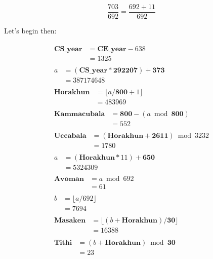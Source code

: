 \documentclass[11pt,oneside]{memoir-article}
\begin{document}
\begin{equation}
\frac{703}{692} = \frac{692 + 11}{692}
\end{equation}

Let's begin then:

\begin{align}
\begin{split}
   \mathbf{CS\_year} &= \mathbf{CE\_year} - 638\\
                     &= 1325
\end{split}\\
\begin{split}
                   a &= (\mathbf{CS\_year} * \mathbf{292207}) + \mathbf{373}\\
                     &= 387174648
\end{split}\\
\begin{split}
\mathbf{Horakhun}    &= \lfloor a / \mathbf{800} + 1 \rfloor\\
                     &= 483969
\end{split}\\
\begin{split}
\mathbf{Kammacubala} &= \mathbf{800} - (a \bmod \mathbf{800})\\
                     &= 552
\end{split}\\
\begin{split}
\mathbf{Uccabala}    &= (\mathbf{Horakhun} + \mathbf{2611}) \bmod 3232\\
                     &= 1780
\end{split}\\
\begin{split}
                   a &= (\mathbf{Horakhun} * 11) + \mathbf{650}\\
                     &= 5324309
\end{split}\\
\begin{split}
\mathbf{Avoman}      &= a \bmod 692\\
                     &= 61
\end{split}\\
\begin{split}
                   b &= \lfloor a / 692 \rfloor\\
                     &= 7694
\end{split}\\
\begin{split}
\mathbf{Masaken}     &= \lfloor (b + \mathbf{Horakhun}) / \mathbf{30} \rfloor\\
                     &= 16388
\end{split}\\
\begin{split}
\mathbf{Tithi}       &= (b + \mathbf{Horakhun}) \bmod \mathbf{30}\\
                     &= 23
\end{split}
\end{align}
\end{document}
